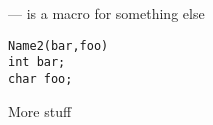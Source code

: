 \startmanpage
{}
--- is a macro for something else 
\startvb\begin{verbatim}
Name2(bar,foo)
int bar;
char foo;

\end{verbatim}
\endvb
More stuff
\endmanpage
